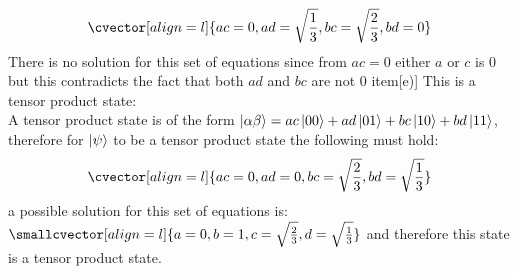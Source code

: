 \begin{itemize}
\begin{equation*}
            \cvector[align=l]{ac = 0,ad = \sqrt{\frac{1}{3}},bc = \sqrt{\frac{2}{3}},bd = 0}
        \end{equation*}
        There is no solution for this set of equations since from $ac = 0$ either $a$ or $c$ is $0$ but this contradicts the fact that both $ad$ and $bc$ are not $0$
    item[e)] This is a tensor product state:\\
    A tensor product state is of the form $\ket{\alpha\beta} = ac\ket{00} + ad\ket{01} + bc\ket{10} + bd\ket{11}$, therefore for $\ket{\psi}$ to be a tensor product state the following must hold:
    \begin{equation*}
        \cvector[align=l]{ac = 0,ad = 0,bc = \sqrt{\frac{2}{3}},bd = \sqrt{\frac{1}{3}}}
    \end{equation*}
    a possible solution for this set of equations is: $\smallcvector[align=l]{a = 0,b = 1,c = \sqrt{\frac{2}{3}},d = \sqrt{\frac{1}{3}}}$ and therefore this state is a tensor product state.
\end{itemize}